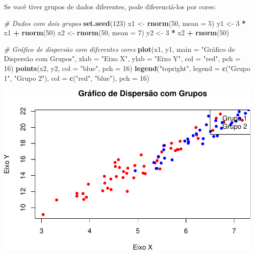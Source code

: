 \documentclass[
]{book}
\newenvironment{Shaded}{\begin{snugshade}}{\end{snugshade}}
\newcommand{\AttributeTok}[1]{\textcolor[rgb]{0.13,0.29,0.53}{#1}}
\newcommand{\CommentTok}[1]{\textcolor[rgb]{0.56,0.35,0.01}{\textit{#1}}}
\newcommand{\DecValTok}[1]{\textcolor[rgb]{0.00,0.00,0.81}{#1}}
\newcommand{\FunctionTok}[1]{\textcolor[rgb]{0.13,0.29,0.53}{\textbf{#1}}}
\newcommand{\NormalTok}[1]{#1}
\newcommand{\OtherTok}[1]{\textcolor[rgb]{0.56,0.35,0.01}{#1}}
\newcommand{\SpecialCharTok}[1]{\textcolor[rgb]{0.81,0.36,0.00}{\textbf{#1}}}
\newcommand{\StringTok}[1]{\textcolor[rgb]{0.31,0.60,0.02}{#1}}
\begin{document}
Se você tiver grupos de dados diferentes, pode diferenciá-los por cores:

\begin{Shaded}
\begin{Highlighting}[]
\CommentTok{\# Dados com dois grupos}
\FunctionTok{set.seed}\NormalTok{(}\DecValTok{123}\NormalTok{)}
\NormalTok{x1 }\OtherTok{\textless{}{-}} \FunctionTok{rnorm}\NormalTok{(}\DecValTok{50}\NormalTok{, }\AttributeTok{mean =} \DecValTok{5}\NormalTok{)}
\NormalTok{y1 }\OtherTok{\textless{}{-}} \DecValTok{3} \SpecialCharTok{*}\NormalTok{ x1 }\SpecialCharTok{+} \FunctionTok{rnorm}\NormalTok{(}\DecValTok{50}\NormalTok{)}
\NormalTok{x2 }\OtherTok{\textless{}{-}} \FunctionTok{rnorm}\NormalTok{(}\DecValTok{50}\NormalTok{, }\AttributeTok{mean =} \DecValTok{7}\NormalTok{)}
\NormalTok{y2 }\OtherTok{\textless{}{-}} \DecValTok{3} \SpecialCharTok{*}\NormalTok{ x2 }\SpecialCharTok{+} \FunctionTok{rnorm}\NormalTok{(}\DecValTok{50}\NormalTok{)}

\CommentTok{\# Gráfico de dispersão com diferentes cores}
\FunctionTok{plot}\NormalTok{(x1, y1, }
     \AttributeTok{main =} \StringTok{"Gráfico de Dispersão com Grupos"}\NormalTok{,}
     \AttributeTok{xlab =} \StringTok{"Eixo X"}\NormalTok{,}
     \AttributeTok{ylab =} \StringTok{"Eixo Y"}\NormalTok{,}
     \AttributeTok{col =} \StringTok{"red"}\NormalTok{, }\AttributeTok{pch =} \DecValTok{16}\NormalTok{)}
\FunctionTok{points}\NormalTok{(x2, y2, }\AttributeTok{col =} \StringTok{"blue"}\NormalTok{, }\AttributeTok{pch =} \DecValTok{16}\NormalTok{)}
\FunctionTok{legend}\NormalTok{(}\StringTok{"topright"}\NormalTok{, }\AttributeTok{legend =} \FunctionTok{c}\NormalTok{(}\StringTok{"Grupo 1"}\NormalTok{, }\StringTok{"Grupo 2"}\NormalTok{), }\AttributeTok{col =} \FunctionTok{c}\NormalTok{(}\StringTok{"red"}\NormalTok{, }\StringTok{"blue"}\NormalTok{), }\AttributeTok{pch =} \DecValTok{16}\NormalTok{)}
\end{Highlighting}
\end{Shaded}

\includegraphics{introR_files/figure-latex/unnamed-chunk-184-1.pdf}
\end{document}
